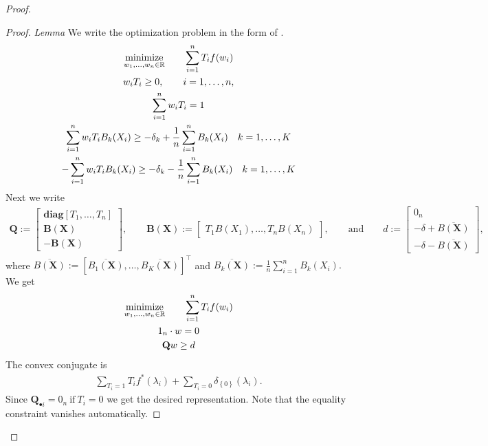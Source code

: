 \begin{proof}
\begin{lemma}
  \end{lemma}
  \begin{proof}
    \emph{Lemma}
    We write the optimization problem in the form of \cite{Tseng1991}.
    \begin{gather*}
    \underset{w_1, \ldots, w_n \in \mathbb{R}}{\mathrm{minimize}}
    \qquad
    \sum_{i = 1}^{n} T_i f(w_i)
    \\
    w_i T_i \ge 0,
    \qquad 
    i = 1, \ldots, n,
    \\
  \sum_{ i = 1 }^{n}
    w_i T_i
  =
  1
    \\  
      \sum_{i = 1}^{n} w_i T_i B_k(X_i)
      \ge
      -\delta_k
      + 
      \frac{1}{n} \sum_{i = 1}^{n} B_k(X_i)
      \quad
      k=1,\ldots,K
    \\  
    -  \sum_{i = 1}^{n} w_i T_i B_k(X_i)
      \ge
      -\delta_k
      - 
      \frac{1}{n} \sum_{i = 1}^{n} B_k(X_i)
      \quad
      k=1,\ldots,K
    \end{gather*}
    Next we write
 \begin{gather*}
    \mathbf{Q}
    :=
    \begin{bmatrix}
      \mathbf{diag}[T_1,\ldots,T_n]\\
      \mathbf{B}(\mathbf{X})\\
      -\mathbf{B}(\mathbf{X})
    \end{bmatrix}
    ,
    \qquad
    \mathbf{B}(\mathbf{X})
    :=
    \begin{bmatrix}
      T_1B(X_1), \ldots, T_nB(X_n)
    \end{bmatrix}
    ,
    \qquad
    \text{and}
    \qquad
    d
    :=
    \begin{bmatrix}
      0_n\\
      -\delta 
      + \overline{B(\mathbf{X})}
      \\
      -\delta
      - \overline{B(\mathbf{X})}
    \end{bmatrix}
    ,
  \end{gather*}
  where
  $
       \overline{B(\mathbf{X})}
       :=
       [
       \overline{B_1(\mathbf{X})}
       ,
       \ldots
       ,
       \overline{B_K(\mathbf{X})}
       ]
       ^\top
  $
and
$
       \overline{B_k(\mathbf{X})}
       :=
      \frac{1}{n} \sum_{i = 1}^{n} B_k(X_i)
      .
$
We get
\begin{gather*}
    \underset{w_1, \ldots, w_n \in \mathbb{R}}{\mathrm{minimize}}
    \qquad
    \sum_{i = 1}^{n} T_i f(w_i)
    \\
    \mathrm{1}_n \cdot w
    =0
    \\
    \mathbf{Q}w \ge d
\end{gather*}
The convex conjugate is
\begin{gather*}
  \sum_{T_i=1} T_i f^*(\lambda_i)
  +
  \sum_{T_i=0} 
  \delta_{\left\{ 0 \right\}}(\lambda_i)
  .
\end{gather*}
Since
$
\mathbf{Q}_{\bullet i}=\mathrm{0}_n
\ 
\text{if}
\ 
T_i=0
$
we get the desired representation. Note that the equality constraint vanishes automatically.
  \end{proof}


\end{proof}
